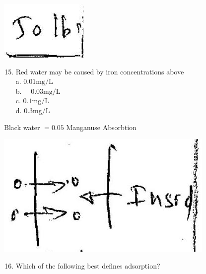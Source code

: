 \documentclass[10pt]{article}
\begin{document}
\includegraphics[max width=\textwidth]{2022_11_11_ca6a6c1a0324ee23e523g-53(2)}

\begin{enumerate}
  \setcounter{enumi}{14}
  \item Red water may be caused by iron concentrations above\\
a. $0.01 \mathrm{mg} / \mathrm{L}$\\
b. $\quad 0.03 \mathrm{mg} / \mathrm{L}$\\
c. $0.1 \mathrm{mg} / \mathrm{L}$\\
d. $0.3 \mathrm{mg} / \mathrm{L}$
\end{enumerate}

Black water $=0.05$ Manganuse Absorbtion

\includegraphics[max width=\textwidth]{2022_11_11_ca6a6c1a0324ee23e523g-53(3)}

\begin{enumerate}
  \setcounter{enumi}{15}
  \item Which of the following best defines adsorption?
\end{enumerate}
\end{document}
